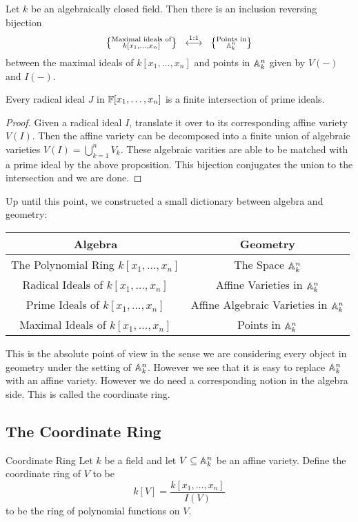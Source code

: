 \documentclass[a4paper]{article}
\begin{document}
\begin{crl}{}{} Let $k$ be an algebraically closed field. Then there is an inclusion reversing bijection $$\left\{\substack{\text{Maximal ideals of}\\ k[x_1,\dots,x_n]}\right\}\;\;\overset{\text{1:1}}{\longleftrightarrow}\;\;\left\{\substack{\text{Points in}\\\mathbb{A}_k^n}\right\}$$ between the maximal ideals of $k[x_1,\dots,x_n]$ and points in $\mathbb{A}_k^n$ given by $V(-)$ and $I(-)$. 
\end{crl}

\begin{prp}{}{} Every radical ideal $J$ in $\mathbb{F}[x_1,\dots,x_n]$ is a finite intersection of prime ideals. \tcbline
\begin{proof}
Given a radical ideal $I$, translate it over to its corresponding affine variety $V(I)$. Then the affine variety can be decomposed into a finite union of algebraic varieties $V(I)=\bigcup_{k=1}^nV_k$. These algebraic varities are able to be matched with a prime ideal by the above proposition. This bijection conjugates the union to the intersection and we are done. 
\end{proof}
\end{prp}

Up until this point, we constructed a small dictionary between algebra and geometry: \\
\begin{center}\begin{tabular}{c|c}
Algebra & Geometry\\
\hline
The Polynomial Ring $k[x_1,\dots,x_n]$ & The Space $\mathbb{A}_k^n$\\
Radical Ideals of $k[x_1,\dots,x_n]$ & Affine Varieties in $\mathbb{A}_k^n$\\
Prime Ideals of $k[x_1,\dots,x_n]$ & Affine Algebraic Varieties in $\mathbb{A}_k^n$\\
Maximal Ideals of $k[x_1,\dots,x_n]$ & Points in $\mathbb{A}_k^n$
\end{tabular}\end{center}

This is the absolute point of view in the sense we are considering every object in geometry under the setting of $\mathbb{A}_k^n$. However we see that it is easy to replace $\mathbb{A}_k^n$ with an affine variety. However we do need a corresponding notion in the algebra side. This is called the coordinate ring. 

\subsection{The Coordinate Ring}
\begin{defn}{Coordinate Ring}{} Let $k$ be a field and let $V\subseteq\mathbb{A}_k^n$ be an affine variety. Define the coordinate ring of $V$ to be $$k[V]=\frac{k[x_1,\dots,x_n]}{I(V)}$$ to be the ring of polynomial functions on $V$. 
\end{defn}
\end{document}
